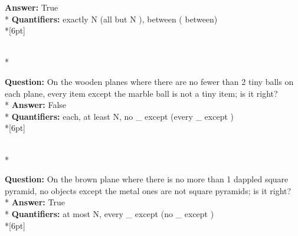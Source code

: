 \begin{figure*}
\begin{minipage}{0.48\textwidth}
\begin{minipage}[t][2.2cm][t]{1\textwidth}
      \textbf{Answer:} True \\*
      \textbf{Quantifiers:} exactly N (all but N ), between ( between) \\*[6pt]
    \end{minipage}\\*
    \begin{minipage}[t][2.2cm][t]{1\textwidth}
      \footnotesize
      \textbf{Question:} On the wooden planes where there are no fewer than 2 tiny balls on each plane, every item except the marble ball is not a tiny item; is it right? \\*
      \textbf{Answer:} False \\*
      \textbf{Quantifiers:} each, at least N, no \_ except (every \_ except ) \\*[6pt]
    \end{minipage}\\*
    \begin{minipage}[t][2.2cm][t]{1\textwidth}
      \footnotesize
      \textbf{Question:} On the brown plane where there is no more than 1 dappled square pyramid, no objects except the metal ones are not square pyramids; is it right? \\*
      \textbf{Answer:} True \\*
      \textbf{Quantifiers:} at most N, every \_ except (no \_ except ) \\*[6pt]
    \end{minipage}
  \end{minipage}
\end{figure*}